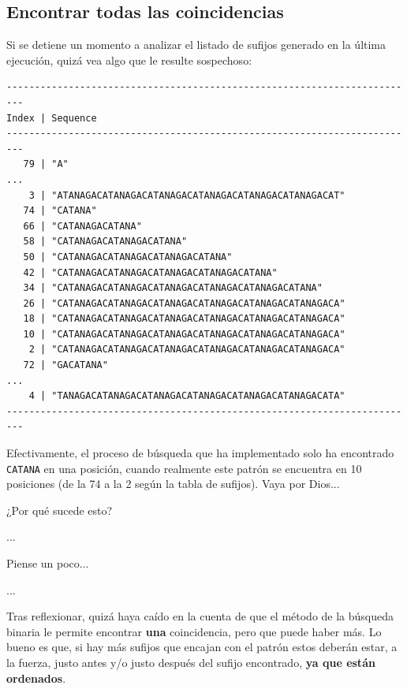 \documentclass[10pt,a4paper,spanish]{article}
\newcommand{\code}[1]{\texttt{#1}}
\begin{document}
\subsection{Encontrar todas las coincidencias}

Si se detiene un momento a analizar el listado de sufijos generado en la última ejecución, quizá vea algo que le resulte sospechoso:

\begin{verbatim}
-------------------------------------------------------------------------
Index | Sequence
-------------------------------------------------------------------------
   79 | "A"
...
    3 | "ATANAGACATANAGACATANAGACATANAGACATANAGACATANAGACAT"
   74 | "CATANA"
   66 | "CATANAGACATANA"
   58 | "CATANAGACATANAGACATANA"
   50 | "CATANAGACATANAGACATANAGACATANA"
   42 | "CATANAGACATANAGACATANAGACATANAGACATANA"
   34 | "CATANAGACATANAGACATANAGACATANAGACATANAGACATANA"
   26 | "CATANAGACATANAGACATANAGACATANAGACATANAGACATANAGACA"
   18 | "CATANAGACATANAGACATANAGACATANAGACATANAGACATANAGACA"
   10 | "CATANAGACATANAGACATANAGACATANAGACATANAGACATANAGACA"
    2 | "CATANAGACATANAGACATANAGACATANAGACATANAGACATANAGACA"
   72 | "GACATANA"
...
    4 | "TANAGACATANAGACATANAGACATANAGACATANAGACATANAGACATA"
-------------------------------------------------------------------------
\end{verbatim}

Efectivamente, el proceso de búsqueda que ha implementado solo ha encontrado \code{CATANA} en una posición, cuando realmente este patrón se encuentra en 10 posiciones (de la 74 a la 2 según la tabla de sufijos). Vaya por Dios...

¿Por qué sucede esto?

\vspace{1cm}

...

\vspace{1cm}

Piense un poco...

\vspace{1cm}
...

\vspace{1cm}

Tras reflexionar, quizá haya caído en la cuenta de que el método de la búsqueda binaria le permite encontrar \textbf{una} coincidencia, pero que puede haber más. Lo bueno es que, si hay más sufijos que encajan con el patrón estos deberán estar, a la fuerza, justo antes y/o justo después del sufijo encontrado, \textbf{ya que están ordenados}.
\end{document}

